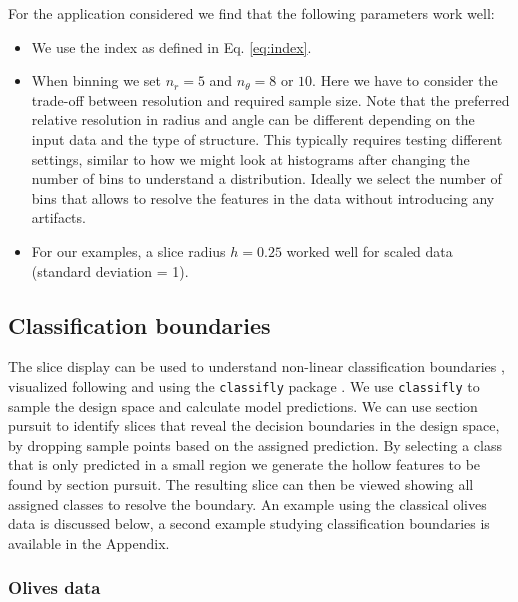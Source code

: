 \documentclass[]{interact}
\theoremstyle{plain}%
\theoremstyle{definition}
\theoremstyle{remark}
\def\tightlist{}
\begin{document}
For the application considered we find that the following parameters
work well:

\begin{itemize}
\tightlist
\item
  We use the index as defined in Eq. \ref{eq:index}.
\item
  When binning we set \(n_r=5\) and \(n_{\theta}=8\) or \(10\). Here we
  have to consider the trade-off between resolution and required sample
  size. Note that the preferred relative resolution in radius and angle
  can be different depending on the input data and the type of
  structure. This typically requires testing different settings, similar
  to how we might look at histograms after changing the number of bins
  to understand a distribution. Ideally we select the number of bins
  that allows to resolve the features in the data without introducing
  any artifacts.
\item
  For our examples, a slice radius \(h=0.25\) worked well for scaled
  data (standard deviation = 1).
\end{itemize}

\hypertarget{classification-boundaries}{%
\subsection{Classification boundaries}\label{classification-boundaries}}

The slice display can be used to understand non-linear classification
boundaries \citep{laa2019slice}, visualized following \citet{sam.11271}
and using the \texttt{classifly} package \citep{classifly}. We use
\texttt{classifly} to sample the design space and calculate model
predictions. We can use section pursuit to identify slices that reveal
the decision boundaries in the design space, by dropping sample points
based on the assigned prediction. By selecting a class that is only
predicted in a small region we generate the hollow features to be found
by section pursuit. The resulting slice can then be viewed showing all
assigned classes to resolve the boundary. An example using the classical
olives data is discussed below, a second example studying classification
boundaries is available in the Appendix.

\hypertarget{sec:olives}{%
\subsubsection*{Olives data}\label{sec:olives}}
\end{document}
